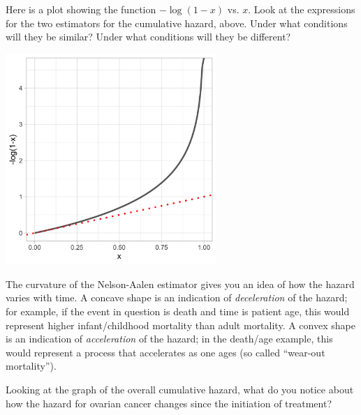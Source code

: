 \newpage

\begin{question}{}
Here is a plot showing the function $-\log(1-x)$ vs. $x$. Look at the expressions for the two estimators for the cumulative hazard, above. Under what conditions will they be similar? Under what conditions will they be different? 
\begin{center}
\includegraphics[width=0.6\textwidth]{img/survival-na-km-comparison.png}
\end{center} 
\end{question}

\vspace{3mm}

\begin{question}{}
The curvature of the Nelson-Aalen estimator gives you an idea of how the hazard varies with time. A concave shape is an indication of \emph{deceleration} of the hazard; for example, if the event in question is death and time is patient age, this would represent higher infant/childhood mortality than adult mortality. A convex shape is an indication of \emph{acceleration} of the hazard; in the death/age example, this would represent a process that accelerates as one ages (so called ``wear-out mortality''). 

Looking at the graph of the overall cumulative hazard, what do you notice about how the hazard for ovarian cancer changes since the initiation of treatment?
\end{question}

\newpage

